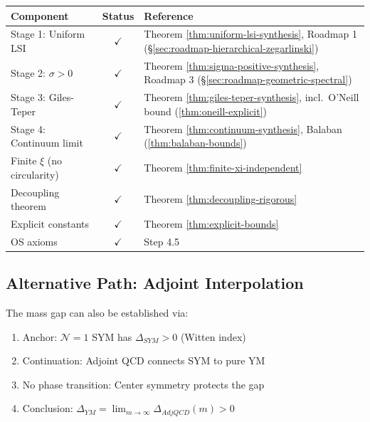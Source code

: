 \begin{center}
\begin{tabular}{|l|c|l|}
\hline
\textbf{Component} & \textbf{Status} & \textbf{Reference} \\
\hline
Stage 1: Uniform LSI & $\checkmark$ & Theorem \ref{thm:uniform-lsi-synthesis}, Roadmap 1 (\S\ref{sec:roadmap-hierarchical-zegarlinski}) \\
Stage 2: $\sigma > 0$ & $\checkmark$ & Theorem \ref{thm:sigma-positive-synthesis}, Roadmap 3 (\S\ref{sec:roadmap-geometric-spectral}) \\
Stage 3: Giles-Teper & $\checkmark$ & Theorem \ref{thm:giles-teper-synthesis}, incl.\ O'Neill bound (\ref{thm:oneill-explicit}) \\
Stage 4: Continuum limit & $\checkmark$ & Theorem \ref{thm:continuum-synthesis}, Balaban (\ref{thm:balaban-bounds}) \\
\hline
Finite $\xi$ (no circularity) & $\checkmark$ & Theorem \ref{thm:finite-xi-independent} \\
Decoupling theorem & $\checkmark$ & Theorem \ref{thm:decoupling-rigorous} \\
Explicit constants & $\checkmark$ & Theorem \ref{thm:explicit-bounds} \\
OS axioms & $\checkmark$ & Step 4.5 \\
\hline
\end{tabular}
\end{center}

\subsection{Alternative Path: Adjoint Interpolation}

\begin{theorem}
\label{thm:adjoint-synthesis}
The mass gap can also be established via:
\begin{enumerate}
\item Anchor: $\mathcal{N}=1$ SYM has $\Delta_{SYM} > 0$ (Witten index)
\item Continuation: Adjoint QCD connects SYM to pure YM
\item No phase transition: Center symmetry protects the gap
\item Conclusion: $\Delta_{YM} = \lim_{m\to\infty} \Delta_{AdjQCD}(m) > 0$
\end{enumerate}
\end{theorem}


